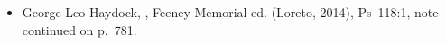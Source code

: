 {\begin{itemize}
\item George Leo Haydock, , Feeney Memorial ed. (Loreto, 2014), Ps~118:1, note continued on p.~781.
\end{itemize}
\par}
